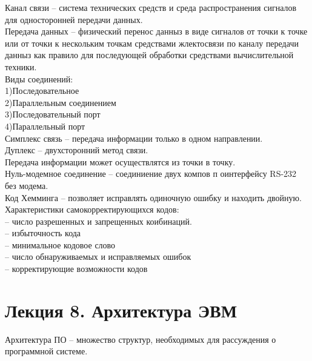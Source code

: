 \documentclass[a4paper, 12pt]{article}
\begin{document}
Канал связи -- система технических средств и среда распространения сигналов для односторонней передачи данных.\\

Передача данных -- физический перенос данныз в виде сигналов от точки к точке или от точки к нескольким точкам средствами жлектосвязи по каналу передачи данныз как правило для последующей обработки средствами вычислительной техники.\\

Виды соединений:\\
1)Последовательное\\
2)Параллельным соединением\\
3)Последовательный порт\\
4)Параллельный порт\\

Симплекс связь -- передача информации только в одном направлении.\\

Дуплекс -- двухсторонний метод связи.\\


Передача информации может осуществлятся из точки в точку.\\
Нуль-модемное соединение -- соединиение двух компов п оинтерфейсу RS-232 без модема.\\


Код Хемминга -- позволяет исправлять одиночную ошибку и находить двойную.\\

Характеристики самокорректирующихся кодов:\\
-- число разрешенных и запрещенных коибинаций.\\
-- избыточность кода\\
-- минимальное кодовое слово\\
-- число обнаруживаемых и исправляемых ошибок\\
-- корректирующие возможности кодов\\

\section*{Лекция 8. Архитектура ЭВМ}
Архитектура ПО -- множество структур, необходимых для рассуждения о программной системе.\\
\end{document}
